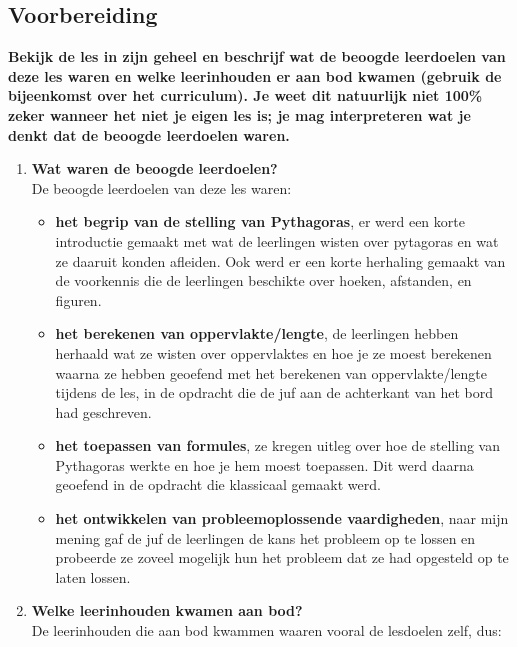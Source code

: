 \documentclass{article}
\begin{document}
        \subsection{Voorbereiding}
            \textbf{Bekijk de les in zijn geheel en beschrijf wat de beoogde leerdoelen van deze les waren en welke leerinhouden er aan bod kwamen (gebruik de bijeenkomst over het curriculum). Je weet dit natuurlijk niet 100\% zeker wanneer het niet je eigen les is; je mag interpreteren wat je denkt dat de beoogde leerdoelen waren.}
            \begin{enumerate}[label=(\alph*)]
                \item \textbf{Wat waren de beoogde leerdoelen?} \\
                    De beoogde leerdoelen van deze les waren:
                    \begin{itemize}
                        \item \textbf{het begrip van de stelling van Pythagoras}, er werd een korte introductie gemaakt met wat de leerlingen wisten over pytagoras en wat ze daaruit konden afleiden. Ook werd er een korte herhaling gemaakt van de voorkennis die de leerlingen beschikte over hoeken, afstanden, en figuren.
                        \item \textbf{het berekenen van oppervlakte/lengte}, de leerlingen hebben herhaald wat ze wisten over oppervlaktes en hoe je ze moest berekenen waarna ze hebben geoefend met het berekenen van oppervlakte/lengte tijdens de les, in de opdracht die de juf aan de achterkant van het bord had geschreven.
                        \item \textbf{het toepassen van formules}, ze kregen uitleg over hoe de stelling van Pythagoras werkte en hoe je hem moest toepassen. Dit werd daarna geoefend in de opdracht die klassicaal gemaakt werd.                        
                        \item \textbf{het ontwikkelen van probleemoplossende vaardigheden}, naar mijn mening gaf de juf de leerlingen de kans het probleem op te lossen en probeerde ze zoveel mogelijk hun het probleem dat ze had opgesteld op te laten lossen.
                    \end{itemize}
                \item \textbf{Welke leerinhouden kwamen aan bod?} \\
                    De leerinhouden die aan bod kwammen waaren vooral de lesdoelen zelf, dus:
                    \begin{itemize}

\end{itemize}
\end{enumerate}
\end{document}
